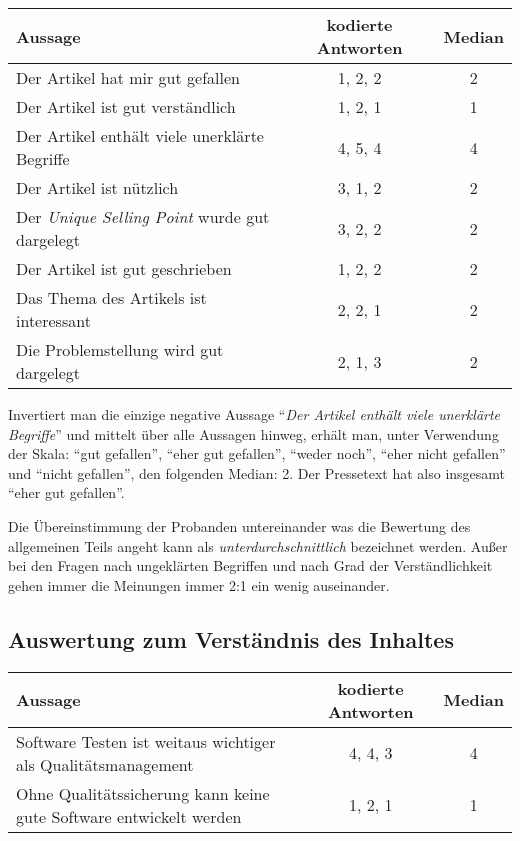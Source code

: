 \begin{table}[!ht]
    \begin{center}
        \begin{tabular}{lcc}
        \toprule
        \textbf{Aussage} & \textbf{kodierte Antworten} & \textbf{Median} \\
        \midrule
        Der Artikel hat mir gut gefallen & 1, 2, 2 & 2 \\
        Der Artikel ist gut verständlich & 1, 2, 1 & 1 \\
        Der Artikel enthält viele unerklärte Begriffe & 4, 5, 4 & 4 \\
        Der Artikel ist nützlich & 3, 1, 2 & 2 \\
        Der \emph{Unique Selling Point} wurde gut dargelegt & 3, 2, 2 & 2 \\
        Der Artikel ist gut geschrieben & 1, 2, 2 & 2 \\
        Das Thema des Artikels ist interessant & 2, 2, 1 & 2 \\
        Die Problemstellung wird gut dargelegt & 2, 1, 3 & 2 \\
        \bottomrule
        \end{tabular}
    \end{center}
\end{table}

Invertiert man die einzige negative Aussage \enquote{\emph{Der Artikel enthält
viele unerklärte Begriffe}} und mittelt über alle Aussagen hinweg, erhält man,
unter Verwendung der Skala: \enquote{gut gefallen}, \enquote{eher gut
gefallen}, \enquote{weder noch}, \enquote{eher nicht gefallen} und
\enquote{nicht gefallen}, den folgenden Median: 2.
Der Pressetext hat also insgesamt \enquote{eher gut gefallen}.

Die Übereinstimmung der Probanden untereinander was die Bewertung des
allgemeinen Teils angeht kann als \emph{unterdurchschnittlich} bezeichnet werden.
Außer bei den Fragen nach ungeklärten Begriffen und nach Grad der Verständlichkeit 
gehen immer die Meinungen immer 2:1 ein wenig auseinander.


\subsection{Auswertung zum Verständnis des Inhaltes}

\begin{table}[!ht]
    \begin{center}
        \begin{tabular}{p{8cm}cc}
        \toprule
        \textbf{Aussage} & \textbf{kodierte Antworten} & \textbf{Median} \\
        \midrule
        Software Testen ist weitaus wichtiger als Qualitätsmanagement & 4, 4, 3 & 4 \\
        \addlinespace
        Ohne Qualitätssicherung kann keine gute Software entwickelt werden & 1, 2, 1 & 1 \\
        \bottomrule
        \end{tabular}
    \end{center}
\end{table}

